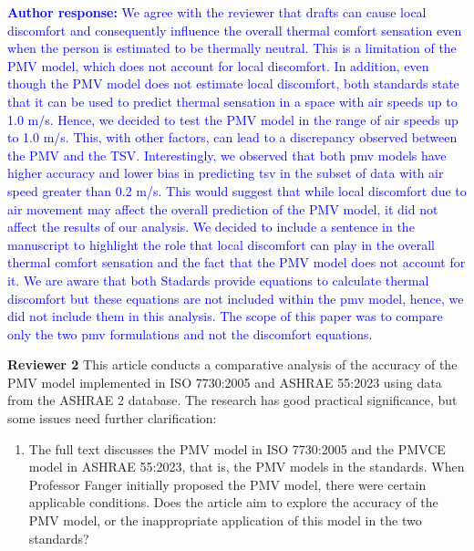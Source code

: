 \documentclass[a4paper, 10pt]{letter}
\newcommand{\response}[1]{\textcolor{blue}{\textbf{Author response:} #1}}
\begin{document}
\begin{letter}
\begin{enumerate}
            \response{
                We agree with the reviewer that drafts can cause local discomfort and consequently influence the overall thermal comfort sensation even when the person is estimated to be thermally neutral.
                This is a limitation of the PMV model, which does not account for local discomfort.
                In addition, even though the PMV model does not estimate local discomfort, both standards state that it can be used to predict thermal sensation in a space with air speeds up to 1.0 m/s.
                Hence, we decided to test the PMV model in the range of air speeds up to 1.0 m/s.
                This, with other factors, can lead to a discrepancy observed between the PMV and the TSV.
                Interestingly, we observed that both \ac{pmv} models have higher accuracy and lower bias in predicting \ac{tsv} in the subset of data with air speed greater than 0.2 m/s.
                This would suggest that while local discomfort due to air movement may affect the overall prediction of the PMV model, it did not affect the results of our analysis.
                We decided to include a sentence in the manuscript to highlight the role that local discomfort can play in the overall thermal comfort sensation and the fact that the PMV model does not account for it.
                We are aware that both Stadards provide equations to calculate thermal discomfort but these equations are not included within the \ac{pmv} model, hence, we did not include them in this analysis.
                The scope of this paper was to compare only the two \ac{pmv} formulations and not the discomfort equations.
            }

        \end{enumerate}

        \textbf{Reviewer 2}
        This article conducts a comparative analysis of the accuracy of the PMV model implemented in ISO 7730:2005 and ASHRAE 55:2023 using data from the ASHRAE 2 database.
        The research has good practical significance, but some issues need further clarification:

        \begin{enumerate}
            \item The full text discusses the PMV model in ISO 7730:2005 and the PMVCE model in ASHRAE 55:2023, that is, the PMV models in the standards.
            When Professor Fanger initially proposed the PMV model, there were certain applicable conditions.
            Does the article aim to explore the accuracy of the PMV model, or the inappropriate application of this model in the two standards?


\end{enumerate}
\end{letter}
\end{document}
